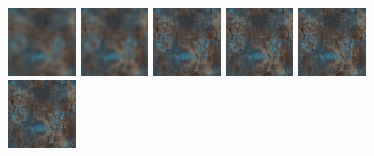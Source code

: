 \begin{figure}[!h]
\includegraphics[width=0.16\textwidth]{img/ch6/dirty/detail1.png}
\includegraphics[width=0.16\textwidth]{img/ch6/dirty/detail2.png}
\includegraphics[width=0.16\textwidth]{img/ch6/dirty/detail3.png}
\includegraphics[width=0.16\textwidth]{img/ch6/dirty/detail4.png}
\includegraphics[width=0.16\textwidth]{img/ch6/dirty/detail5.png}
\includegraphics[width=0.16\textwidth]{img/ch6/dirty/detail6.png}


\end{figure}
